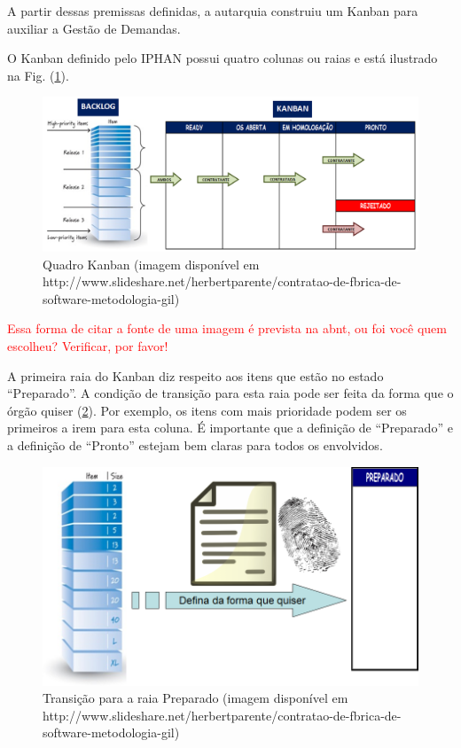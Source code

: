 A partir dessas premissas definidas, a autarquia construiu um Kanban para auxiliar a Gestão de Demandas.

O Kanban definido pelo IPHAN possui quatro colunas ou raias e está ilustrado na Fig. (\ref{kanban1}).

\begin{figure}[H]
		\centering
		
			\includegraphics[scale=0.5]{figuras/kanbanIPHAN1.png}
		\caption{Quadro Kanban (imagem disponível em http://www.slideshare.net/herbertparente/contratao-de-fbrica-de-software-metodologia-gil)}
	\label{kanban1}
\end{figure}

\textcolor{red}{Essa forma de citar a fonte de uma imagem é prevista na abnt, ou foi você quem escolheu? Verificar, por favor!} 

A primeira raia do Kanban diz respeito aos itens que estão no estado “Preparado”. A condição de transição para esta raia pode ser feita da forma que o órgão quiser (\ref{kanban2}). Por exemplo, os itens com mais prioridade podem ser os primeiros a irem para esta coluna. É importante que a definição de “Preparado” e a definição de “Pronto” estejam bem claras para todos os envolvidos.  

\begin{figure}[H]
		\centering
		
			\includegraphics[scale=0.5]{figuras/kanbanIPHAN2.png}
		\caption{Transição para a raia Preparado (imagem disponível em http://www.slideshare.net/herbertparente/contratao-de-fbrica-de-software-metodologia-gil)}
		\label{kanban2}
\end{figure}

